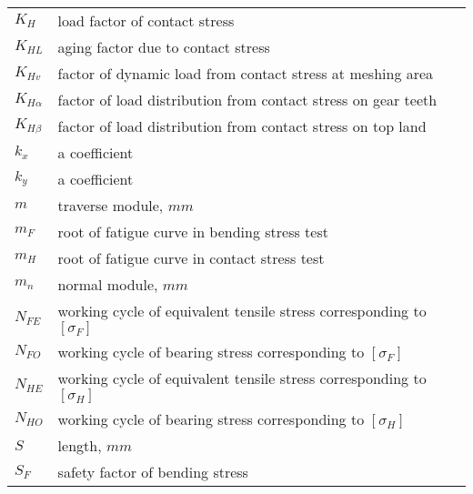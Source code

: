 \begin{tabular}[t]{lp{6.5cm}}
	$ K_H $ & load factor of contact stress\\
	$ K_{HL} $ & aging factor due to contact stress\\
	$ K_{Hv} $ & factor of dynamic load from contact stress at meshing area\\
	$ K_{H\alpha} $ & factor of load distribution from contact stress on gear teeth\\
	$ K_{H\beta} $ & factor of load distribution from contact stress on top land\\
	$ k_x $ & a coefficient\\
	$ k_y $ & a coefficient\\
	$ m $ & traverse module, $ mm $\\
	$ m_F $ & root of fatigue curve in bending stress test\\
	$ m_H $ & root of fatigue curve in contact stress test\\
	$ m_n $ & normal module, $ mm $\\
	$ N_{FE} $ & working cycle of equivalent tensile stress corresponding to $ [\sigma_F] $\\
	$ N_{FO} $ & working cycle of bearing stress corresponding to $ [\sigma_F] $\\
	$ N_{HE} $ & working cycle of equivalent tensile stress corresponding to $ [\sigma_H] $\\
	$ N_{HO} $ & working cycle of bearing stress corresponding to $ [\sigma_H] $\\
	$ S $ & length, $ mm $\\
	$ S_F $ & safety factor of bending stress\\
\end{tabular}
